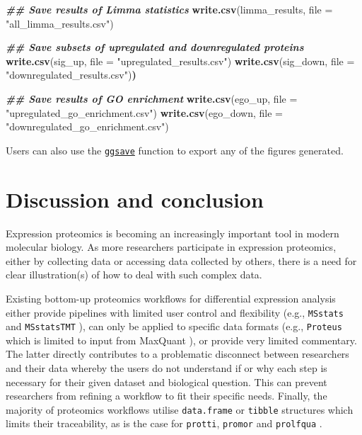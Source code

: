 \documentclass[9pt,a4paper,]{extarticle}
\newenvironment{Shaded}{\begin{snugshade}}{\end{snugshade}}
\newcommand{\AttributeTok}[1]{\textcolor[rgb]{0.13,0.29,0.53}{#1}}
\newcommand{\DocumentationTok}[1]{\textcolor[rgb]{0.56,0.35,0.01}{\textbf{\textit{#1}}}}
\newcommand{\ErrorTok}[1]{\textcolor[rgb]{0.64,0.00,0.00}{\textbf{#1}}}
\newcommand{\FunctionTok}[1]{\textcolor[rgb]{0.13,0.29,0.53}{\textbf{#1}}}
\newcommand{\NormalTok}[1]{#1}
\newcommand{\StringTok}[1]{\textcolor[rgb]{0.31,0.60,0.02}{#1}}
\begin{document}
\begin{Shaded}
\begin{Highlighting}[]
\DocumentationTok{\#\# Save results of Limma statistics}
\FunctionTok{write.csv}\NormalTok{(limma\_results, }\AttributeTok{file =} \StringTok{"all\_limma\_results.csv"}\NormalTok{)}

\DocumentationTok{\#\# Save subsets of upregulated and downregulated proteins}
\FunctionTok{write.csv}\NormalTok{(sig\_up, }\AttributeTok{file =} \StringTok{"upregulated\_results.csv"}\NormalTok{)}
\FunctionTok{write.csv}\NormalTok{(sig\_down, }\AttributeTok{file =} \StringTok{"downregulated\_results.csv"}\NormalTok{)}\ErrorTok{)}

\DocumentationTok{\#\# Save results of GO enrichment}
\FunctionTok{write.csv}\NormalTok{(ego\_up, }\AttributeTok{file =} \StringTok{"upregulated\_go\_enrichment.csv"}\NormalTok{)}
\FunctionTok{write.csv}\NormalTok{(ego\_down, }\AttributeTok{file =} \StringTok{"downregulated\_go\_enrichment.csv"}\NormalTok{)}
\end{Highlighting}
\end{Shaded}

Users can also use the \href{https://www.rdocumentation.org/packages/ggplot2/versions/0.9.0/topics/ggsave}{\texttt{ggsave}}
function to export any of the figures generated.

\section{Discussion and conclusion}\label{discussion-and-conclusion}

Expression proteomics is becoming an increasingly important tool in modern
molecular biology. As more researchers participate in expression proteomics,
either by collecting data or accessing data collected by others, there is a need
for clear illustration(s) of how to deal with such complex data.

Existing bottom-up proteomics workflows for differential expression analysis
either provide pipelines with limited user control and flexibility (e.g., \texttt{MSstats}
and \texttt{MSstatsTMT} \citep{Choi2014, Huang2020}), can only be applied to specific data
formats (e.g., \texttt{Proteus} which is limited to input from MaxQuant \citep{Gierlinski2018}),
or provide very limited commentary. The latter directly contributes to a
problematic disconnect between researchers and their data whereby the users do
not understand if or why each step is necessary for their given dataset and
biological question. This can prevent researchers from refining a workflow to fit
their specific needs. Finally, the majority of proteomics workflows utilise
\texttt{data.frame} or \texttt{tibble} structures which limits their traceability, as is the
case for \texttt{protti}, \texttt{promor} and \texttt{prolfqua} \citep{Ranathunge2022, Quast2021, Wolski2022}.
\end{document}
